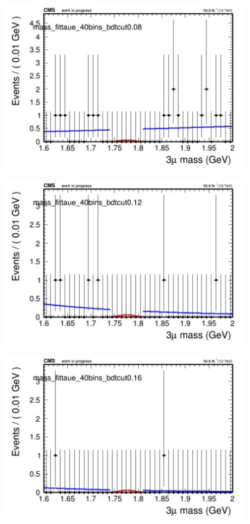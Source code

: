 \begin{figure}[H]
\begin{subfigure}{0.2\textwidth}
        \caption{}
    \end{subfigure}
    \begin{subfigure}{0.2\textwidth}
        \includegraphics[width=\textwidth]{power_law/plots/taue/massfit_taue_40bins_bdtcut0.08.png}
        \caption{}
    \end{subfigure}
    \begin{subfigure}{0.2\textwidth}
        \includegraphics[width=\textwidth]{power_law/plots/taue/massfit_taue_40bins_bdtcut0.12.png}
        \caption{}
    \end{subfigure}
    \begin{subfigure}{0.2\textwidth}
        \includegraphics[width=\textwidth]{power_law/plots/taue/massfit_taue_40bins_bdtcut0.16.png}

\end{subfigure}
\end{figure}
